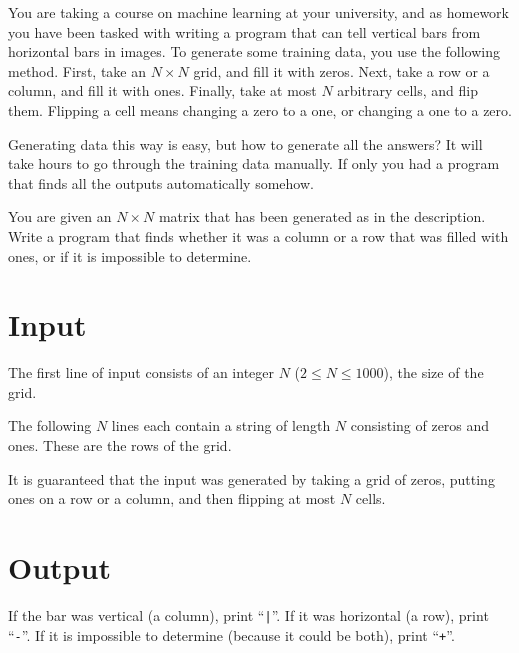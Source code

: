 

You are taking a course on machine learning at your university, and as homework you have been tasked
with writing a program that can tell vertical bars from horizontal bars in images. To generate some
training data, you use the following method. First, take an $N \times N$ grid, and fill it with zeros. Next,
take a row or a column, and fill it with ones. Finally, take at most $N$ arbitrary cells, and flip them.
Flipping a cell means changing a zero to a one, or changing a one to a zero.

Generating data this way is easy, but how to generate all the answers? It will take hours
to go through the training data manually. If only you had a program that finds all
the outputs automatically somehow.

You are given an $N \times N$ matrix that has been generated as in the description. Write a program that
finds whether it was a column or a row that was filled with ones, or if it is impossible to determine.


\section*{Input}
The first line of input consists of an integer $N$ ($2 \leq N \leq 1000$), the size of the grid.

The following $N$ lines each contain a string of length $N$ consisting of zeros and ones.
These are the rows of the grid.

It is guaranteed that the input was generated by taking a grid of zeros, putting ones on
a row or a column, and then flipping at most $N$ cells.

\section*{Output}
If the bar was vertical (a column), print ``\texttt{|}''.
If it was horizontal (a row), print ``\texttt{-}''.
If it is impossible to determine (because it could be both), print ``\texttt{+}''.
